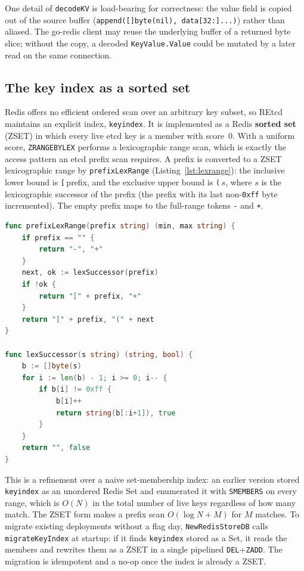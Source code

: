 One detail of \texttt{decodeKV} is load-bearing for correctness: the value field is copied out of the source buffer (\texttt{append([]byte(nil), data[32:]...)}) rather than aliased. The go-redis client may reuse the underlying buffer of a returned byte slice; without the copy, a decoded \texttt{KeyValue.Value} could be mutated by a later read on the same connection.

\subsection{The key index as a sorted set}
\label{sec:impl-keyindex}

Redis offers no efficient ordered scan over an arbitrary key subset, so REtcd maintains an explicit index, \texttt{keyindex}. It is implemented as a Redis \textbf{sorted set} (ZSET) in which every live etcd key is a member with score~0. With a uniform score, \texttt{ZRANGEBYLEX} performs a lexicographic range scan, which is exactly the access pattern an etcd prefix scan requires. A prefix is converted to a ZSET lexicographic range by \texttt{prefixLexRange} (Listing~\ref{lst:lexrange}): the inclusive lower bound is \texttt{[}\,prefix, and the exclusive upper bound is \texttt{(}\,$s$, where $s$ is the lexicographic successor of the prefix (the prefix with its last non-\texttt{0xff} byte incremented). The empty prefix maps to the full-range tokens \texttt{-} and \texttt{+}.

\begin{lstlisting}[language=Go,caption={Deriving a \texttt{ZRANGEBYLEX} window from an etcd prefix (\texttt{store/redis.go}).},label=lst:lexrange]
func prefixLexRange(prefix string) (min, max string) {
    if prefix == "" {
        return "-", "+"
    }
    next, ok := lexSuccessor(prefix)
    if !ok {
        return "[" + prefix, "+"
    }
    return "[" + prefix, "(" + next
}

func lexSuccessor(s string) (string, bool) {
    b := []byte(s)
    for i := len(b) - 1; i >= 0; i-- {
        if b[i] != 0xff {
            b[i]++
            return string(b[:i+1]), true
        }
    }
    return "", false
}
\end{lstlisting}

This is a refinement over a naive set-membership index: an earlier version stored \texttt{keyindex} as an unordered Redis Set and enumerated it with \texttt{SMEMBERS} on every range, which is $O(N)$ in the total number of live keys regardless of how many match. The ZSET form makes a prefix scan $O(\log N + M)$ for $M$ matches. To migrate existing deployments without a flag day, \texttt{NewRedisStoreDB} calls \texttt{migrateKeyIndex} at startup: if it finds \texttt{keyindex} stored as a Set, it reads the members and rewrites them as a ZSET in a single pipelined \texttt{DEL}+\texttt{ZADD}. The migration is idempotent and a no-op once the index is already a ZSET.

